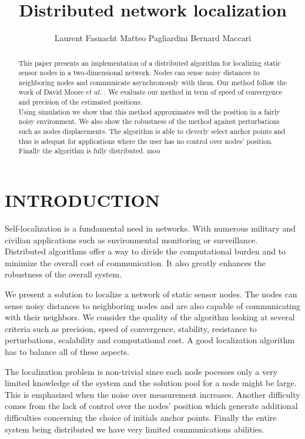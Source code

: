 \documentclass[letterpaper, 10 pt, conference]{ieeeconf}  %
\title{\LARGE \bf
 Distributed network localization
}
\author{Laurent Fasnacht Matteo Pagliardini Bernard Maccari%
}
\begin{document}
\maketitle
\thispagestyle{empty}
\pagestyle{empty}


\begin{abstract}
This paper presents an implementation of a distributed algorithm for localizing static sensor nodes in a two-dimensional network. Nodes can sense noisy distances to neighboring nodes and communicate asynchronously with them. Our method follow the work of David Moore $et$ $al.$ \cite{MooreTeller}. We evaluate our method in term of speed of convergence and precision of the estimated positions. \\
Using simulation we show that this method approximates well the position in a fairly noisy environment. We also show the robustness of the method against perturbations such as nodes displacements. The algorithm is able to cleverly select anchor points and thus is adequat for applications where the user has no control over nodes' position. Finally the algorithm is fully distributed.
moo\end{abstract}


\section{INTRODUCTION}

Self-localization is a fundamental need in networks. With numerous military and civilian applications such as environmental monitoring or surveillance.  Distributed algorithms offer a way to divide the computational burden and to minimize the overall cost of communication. It also greatly enhances the robustness of the overall system. 

We present a solution to localize a network of static sensor nodes. The nodes can sense noisy distances to neighboring nodes and are also capable of communicating with their neighbors. We consider the quality of the algorithm looking at several criteria such as precision, speed of convergence, stability, resistance to perturbations, scalability and computational cost. A good localization algorithm has to balance all of these aspects.

The localization problem is non-trivial since each node pocesses only a very limited knowledge of the system and the solution pool for a node might be large. This is emphasized when the noise over measurement increases. Another difficulty comes from the lack of control over the nodes' position which generate additional difficulties concerning the choice of initials anchor points. Finally the entire system being distributed we have very limited communications abilities. 
\end{document}
